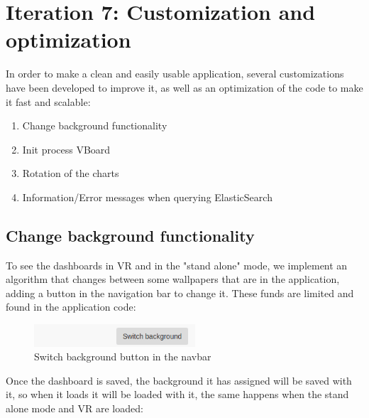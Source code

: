 \documentclass[a4paper, 12pt]{book}
\begin{document}
\section{Iteration 7: Customization and optimization}

In order to make a clean and easily usable application, several customizations have been developed to improve it, as well as an optimization of the code to make it fast and scalable:

\begin{enumerate}
    \item Change background functionality
    \item Init process VBoard
    \item Rotation of the charts
    \item Information/Error messages when querying ElasticSearch
\end{enumerate}

\subsection{Change background functionality}

To see the dashboards in VR and in the "stand alone" mode, we implement an algorithm that changes between some wallpapers that are in the application, adding a button in the navigation bar to change it. These funds are limited and found in the application code:

\begin{figure}[H]
  \centering
  \includegraphics[width=6cm, keepaspectratio]{img/development/switchbackgroundbutton}
  \caption{Switch background button in the navbar}
  \label{fig:examplestandalone}
\end{figure}


Once the dashboard is saved, the background it has assigned will be saved with it, so when it loads it will be loaded with it, the same happens when the stand alone mode and VR are loaded:
\end{document}

